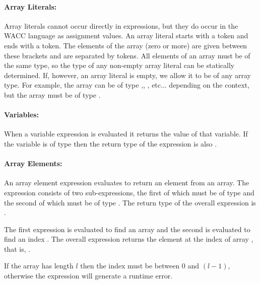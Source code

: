\documentclass[a4paper]{article}
\theoremstyle{definition}
\begin{document}
\paragraph{Array Literals:} Array literals cannot occur directly in expressions, but they do occur in the WACC language as assignment values.
An array literal starts with a \lit{[} token and ends with a \lit{]} token. 
The elements of the array (zero or more) are given between these brackets and are separated by \lit{,} tokens. 
All elements of an array must be of the same type, so the type of any non-empty array literal can be statically determined.
If, however, an array literal is empty, we allow it to be of any array type.
For example, the array \lit{[]} can be of type ,, , etc... depending on the context, but the array \lit{[1]} must be of type .

\paragraph{Variables:}
When a variable expression  is evaluated it returns the value of that variable. 
If the variable is of type  then the return type of the expression is also .

\paragraph{Array Elements:}
An array element expression evaluates to return an element from an array.
The expression consists of two sub-expressions, the first of which must be of type  and the second of which must be of type .
The return type of the overall expression is .

The first expression is evaluated to find an array  and the second is evaluated to find an index .
The overall expression returns the element at the index  of array , that is, .

If the array has length $l$ then the index  must be between $0$ and $(l - 1)$, 
otherwise the expression will generate a runtime error. 
\end{document}
